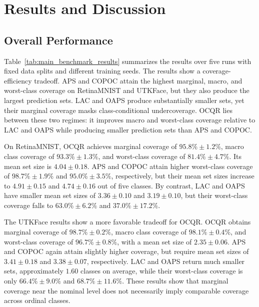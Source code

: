 \documentclass[conference]{IEEEtran}
\begin{document}
\section{Results and Discussion} \label{results}
\subsection{Overall Performance}
Table~\ref{tab:main_benchmark_results} summarizes the results over five runs with fixed data splits and different training seeds. The results show a coverage-efficiency tradeoff. APS and COPOC attain the highest marginal, macro, and worst-class coverage on RetinaMNIST and UTKFace, but they also produce the largest prediction sets. LAC and OAPS produce substantially smaller sets, yet their marginal coverage masks class-conditional undercoverage. OCQR lies between these two regimes: it improves macro and worst-class coverage relative to LAC and OAPS while producing smaller prediction sets than APS and COPOC.

On RetinaMNIST, OCQR achieves marginal coverage of \(95.8\%\pm1.2\%\), macro class coverage of \(93.3\%\pm1.3\%\), and worst-class coverage of \(81.4\%\pm4.7\%\). Its mean set size is \(4.04\pm0.18\). APS and COPOC attain higher worst-class coverage of \(98.7\%\pm1.9\%\) and \(95.0\%\pm3.5\%\), respectively, but their mean set sizes increase to \(4.91\pm0.15\) and \(4.74\pm0.16\) out of five classes. By contrast, LAC and OAPS have smaller mean set sizes of \(3.36\pm0.10\) and \(3.19\pm0.10\), but their worst-class coverage falls to \(63.0\%\pm6.2\%\) and \(37.0\%\pm17.2\%\).

The UTKFace results show a more favorable tradeoff for OCQR. OCQR obtains marginal coverage of \(98.7\%\pm0.2\%\), macro class coverage of \(98.1\%\pm0.4\%\), and worst-class coverage of \(96.7\%\pm0.8\%\), with a mean set size of \(2.35\pm0.06\). APS and COPOC again attain slightly higher coverage, but require mean set sizes of \(3.41\pm0.18\) and \(3.38\pm0.07\), respectively. LAC and OAPS return much smaller sets, approximately \(1.60\) classes on average, while their worst-class coverage is only \(66.4\%\pm9.0\%\) and \(68.7\%\pm11.6\%\). These results show that marginal coverage near the nominal level does not necessarily imply comparable coverage across ordinal classes.
\end{document}
